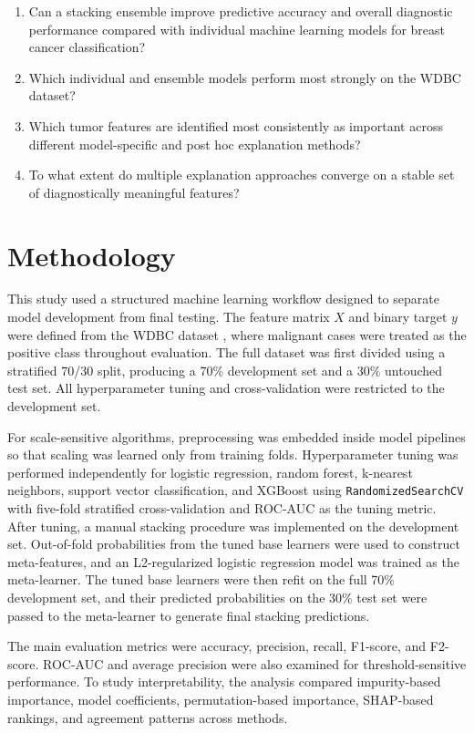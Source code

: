 \documentclass[conference]{IEEEtran}
\begin{document}
\begin{enumerate}[leftmargin=*, itemsep=2pt]
    \item \textbf{} Can a stacking ensemble improve predictive accuracy and overall diagnostic performance compared with individual machine learning models for breast cancer classification?
    \item \textbf{} Which individual and ensemble models perform most strongly on the WDBC dataset?
    \item \textbf{} Which tumor features are identified most consistently as important across different model-specific and post hoc explanation methods?
    \item \textbf{} To what extent do multiple explanation approaches converge on a stable set of diagnostically meaningful features?
\end{enumerate}

\section{Methodology}
This study used a structured machine learning workflow designed to separate model development from final testing. The feature matrix $X$ and binary target $y$ were defined from the WDBC dataset \cite{b8}, where malignant cases were treated as the positive class throughout evaluation. The full dataset was first divided using a stratified 70/30 split, producing a 70\% development set and a 30\% untouched test set. All hyperparameter tuning and cross-validation were restricted to the development set.

For scale-sensitive algorithms, preprocessing was embedded inside model pipelines so that scaling was learned only from training folds. Hyperparameter tuning was performed independently for logistic regression, random forest, k-nearest neighbors, support vector classification, and XGBoost using \texttt{RandomizedSearchCV} with five-fold stratified cross-validation and ROC-AUC as the tuning metric. After tuning, a manual stacking procedure was implemented on the development set. Out-of-fold probabilities from the tuned base learners were used to construct meta-features, and an L2-regularized logistic regression model was trained as the meta-learner. The tuned base learners were then refit on the full 70\% development set, and their predicted probabilities on the 30\% test set were passed to the meta-learner to generate final stacking predictions.

The main evaluation metrics were accuracy, precision, recall, F1-score, and F2-score. ROC-AUC and average precision were also examined for threshold-sensitive performance. To study interpretability, the analysis compared impurity-based importance, model coefficients, permutation-based importance, SHAP-based rankings, and agreement patterns across methods.
\end{document}
